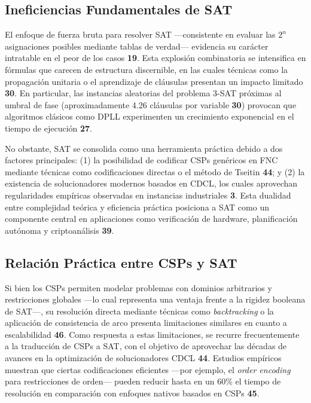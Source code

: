 \subsection{Ineficiencias Fundamentales de SAT}
\label{subsec:ineficiencia-sat}

El enfoque de fuerza bruta para resolver SAT —consistente en evaluar las $2^n$ asignaciones posibles mediante tablas de verdad— evidencia su carácter intratable en el peor de los casos \textbf{19}. Esta explosión combinatoria se intensifica en fórmulas que carecen de estructura discernible, en las cuales técnicas como la propagación unitaria o el aprendizaje de cláusulas presentan un impacto limitado \textbf{30}. En particular, las instancias aleatorias del problema 3-SAT próximas al umbral de fase (aproximadamente 4.26 cláusulas por variable \textbf{30}) provocan que algoritmos clásicos como DPLL experimenten un crecimiento exponencial en el tiempo de ejecución \textbf{27}.

No obstante, SAT se consolida como una herramienta práctica debido a dos factores principales: (1) la posibilidad de codificar CSPs genéricos en FNC mediante técnicas como codificaciones directas o el método de Tseitin \textbf{44}; y (2) la existencia de solucionadores modernos basados en CDCL, los cuales aprovechan regularidades empíricas observadas en instancias industriales \textbf{3}. Esta dualidad entre complejidad teórica y eficiencia práctica posiciona a SAT como un componente central en aplicaciones como verificación de hardware, planificación autónoma y criptoanálisis \textbf{39}.

\subsection{Relación Práctica entre CSPs y SAT}
\label{subsec:csp-sat-relacion}

Si bien los CSPs permiten modelar problemas con dominios arbitrarios y restricciones globales —lo cual representa una ventaja frente a la rigidez booleana de SAT—, su resolución directa mediante técnicas como \textit{backtracking} o la aplicación de consistencia de arco presenta limitaciones similares en cuanto a escalabilidad \textbf{46}. Como respuesta a estas limitaciones, se recurre frecuentemente a la traducción de CSPs a SAT, con el objetivo de aprovechar las décadas de avances en la optimización de solucionadores CDCL \textbf{44}. Estudios empíricos muestran que ciertas codificaciones eficientes —por ejemplo, el \textit{order encoding} para restricciones de orden— pueden reducir hasta en un 60\% el tiempo de resolución en comparación con enfoques nativos basados en CSPs \textbf{45}.

